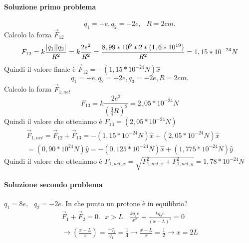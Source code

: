 \paragraph{Soluzione primo problema}
\begin{equation}
  q_1=+e,q_2=+2e, \text{ } R=2cm.
\end{equation}
Calcolo la forza $\vec{F}_{12}$
\begin{equation}
  F_{12}=k\frac{\lvert q_1\rvert\lvert q_2\rvert}{R^2}=k\frac{2e^2}{R^2}=\frac{8,99*10^9*2*(1,6*10^{19})}{R^2}=1,15*10^{-24}N
\end{equation}
Quindi il valore finale è $\vec{F}_{12}=-(1,15*10^{-24}N)\hat{x}$
\begin{equation}
  q_1=+e, q_2 = +2e,q_3=-2e, R=2cm.
\end{equation}
Calcolo la forza $\vec{F}_{1,net}$
\begin{equation}
 F_{13}=k\frac{2e^2}{\left(\frac{3}{4}R\right)^2}=2,05*10^{-24}N
\end{equation}
Quindi il valore che otteniamo è $F_{13}=(2,05*10^{-24}N)$
\begin{equation}
  \begin{matrix}
  \vec{F}_{1,net}=\vec{F}_{12}+\vec{F}_{13}=-(1,15*10^{-24}N)\hat{x}+(2,05*10^{-24}N)
    \hat{x}\\=(0,90*10^{24}N)\hat{y}=-(0,125*10^{-24}N)\hat{x}+(1,775*10^{-24}N)\hat{y}
  \end{matrix}
\end{equation}
Quindi il valore che otteniamo è $F_{1,net,x}=\sqrt{F^2_{1,net,x}+F^2_{1,net,y}}=1,78*10^{-24}N$
\paragraph{Soluzione secondo problema}
$q_1=8e,\text{ } q_2=-2e$. In che punto un protone è in equilibrio?
\begin{equation}
  \begin{matrix}
    \vec{F}_1+\vec{F}_2=0. \text{ } x>L.\text{ } \frac{kq_1e}{x^2}+\frac{kq_2e}{(x-L)^2}=0\\
    \to \left(\frac{x-L}{x}\right)=\frac{-q_2}{q_1}=\frac{1}{4}\to \frac{x-L}{x}=\frac{1}{2}\to x=2L
  \end{matrix}
\end{equation}

